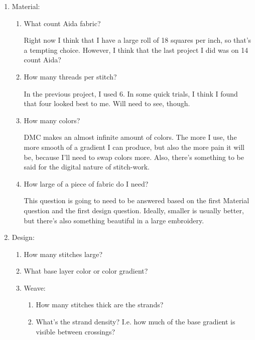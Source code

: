 \documentclass[12pt]{article}
\renewcommand{\,}{\textsuperscript{,}}
\begin{document}
\begin{enumerate}  
\item Material:

\begin{enumerate}

\item What count Aida fabric?

Right now I think that I have a large roll of 18 squares per inch, so that's a tempting choice. However, I think that the last project I did was on 14 count Aida?

\item How many threads per stitch?

In the previous project, I used 6. In some quick trials, I think I found that four looked best to me. Will need to see, though.

\item How many colors?

DMC makes an almost infinite amount of colors. The more I use, the more smooth of a gradient I can produce, but also the more pain it will be, because I'll need to swap colors more. Also, there's something to be said for the digital nature of stitch-work.

\item How large of a piece of fabric do I need?

This question is going to need to be answered based on the first Material question and the first design question. Ideally, smaller is usually better, but there's also something beautiful in a large embroidery.

\end{enumerate}

\item Design:

\begin{enumerate}

\item How many stitches large?

\item What base layer color or color gradient?

\item Weave:

\begin{enumerate}

\item How many stitches thick are the strands?

\item What's the strand density? I.e. how much of the base gradient is visible between crossings?


\end{enumerate}
\end{enumerate}
\end{enumerate}
\end{document}
